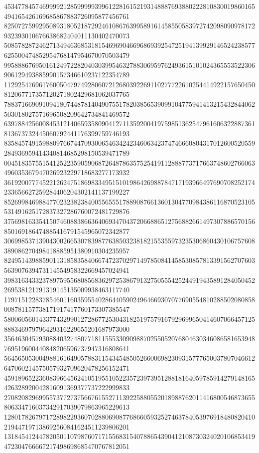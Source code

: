 \begin{DoxyCode}
      453477845746999921285999993996122816152193148887693880222810830019860165494165426169685867883726095877456761
      825072759929508931805218729246108676399589161458550583972742098090978172932393010676638682404011130402470073
      508578287246271349463685318154696904669686939254725194139929146524238577625500474852954768147954670070503479
      995888676950161249722820403039954632788306959762493615101024365553522306906129493885990157346610237122354789
      112925476961760050479749280607212680392269110277722610254414922157650450812067717357120271802429681062037765
      788371669091094180744878140490755178203856539099104775941413215432844062503018027571696508209642734841469572
      639788425600845312140659358090412711359200419759851362547961606322887361813673732445060792441176399759746193
      835845749159880976674470930065463424234606342374746660804317012600520559284936959414340814685298150539471789
      004518357551541252235905906872648786357525419112888773717663748602766063496035367947026923229718683277173932
      361920077745221262475186983349515101986426988784717193966497690708252174233656627259284406204302141137199227
      852699846988477023238238400556555178890876613601304770984386116870523105531491625172837327286760072481729876
      375698163354150746088386636406934704372066886512756882661497307886570156850169186474885416791545965072342877
      306998537139043002665307839877638503238182155355973235306860430106757608389086270498418885951380910304235957
      824951439885901131858358406674723702971497850841458530857813391562707603563907639473114554958322669457024941
      398316343323789759556808568362972538679132750555425244919435891284050452269538121791319145135009938463117740
      179715122837854601160359554028644059024964669307077690554810288502080858008781157738171917417760173307385547
      580060560143377432990127286772530431825197579167929699650414607066457125888346979796429316229655201687973000
      356463045793088403274807718115553309098870255052076804630346086581653948769519600440848206596737947316808641
      564565053004988161649057883115434548505266006982309315777650037807046612647060214575057932709620478256152471
      459189652236083966456241051955105223572397395128818164059785914279148165426328920042816091369377737222999833
      270820829699557377273756676155271139225880552018988762011416800546873655806334716037342917039079863965229613
      128017826797172898229360702880690877686605932527463784053976918480820410219447197138692560841624511239806201
      131845412447820501107987607171556831540788654390412108730324020106853419472304766667217498698685470767812051

\end{DoxyCode}
